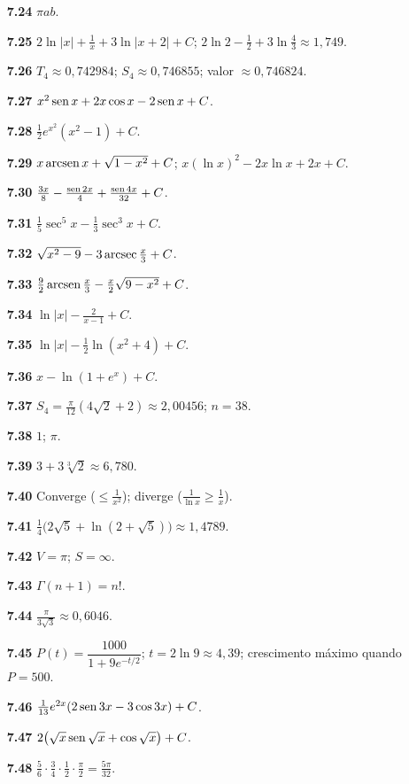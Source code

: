 {\begin{multicols}{2}
\begin{itemize}[leftmargin=2.7em,labelsep=0.5em,itemsep=1pt]
\item[\textbf{7.24}] $\pi ab$.
\item[\textbf{7.25}] $2\ln|x|+\frac1x+3\ln|x+2|+C$; $2\ln2-\tfrac12+3\ln\tfrac43\approx1{,}749$.
\item[\textbf{7.26}] $T_4\approx0{,}742984$; $S_4\approx0{,}746855$; valor $\approx0{,}746824$.
\item[\textbf{7.27}] $x^2\operatorname{sen} x+2x\cos x-2\operatorname{sen} x+C$.
\item[\textbf{7.28}] $\tfrac12e^{x^2}(x^2-1)+C$.
\item[\textbf{7.29}] $x\operatorname{arcsen} x+\sqrt{1-x^2}+C$; $x(\ln x)^2-2x\ln x+2x+C$.
\item[\textbf{7.30}] $\tfrac{3x}8-\tfrac{\operatorname{sen}2x}4+\tfrac{\operatorname{sen}4x}{32}+C$.
\item[\textbf{7.31}] $\tfrac15\sec^5x-\tfrac13\sec^3x+C$.
\item[\textbf{7.32}] $\sqrt{x^2-9}-3\operatorname{arcsec}\tfrac x3+C$.
\item[\textbf{7.33}] $\tfrac92\operatorname{arcsen}\tfrac x3-\tfrac x2\sqrt{9-x^2}+C$.
\item[\textbf{7.34}] $\ln|x|-\tfrac2{x-1}+C$.
\item[\textbf{7.35}] $\ln|x|-\tfrac12\ln(x^2+4)+C$.
\item[\textbf{7.36}] $x-\ln(1+e^x)+C$.
\item[\textbf{7.37}] $S_4=\tfrac\pi{12}(4\sqrt2+2)\approx2{,}00456$; $n=38$.
\item[\textbf{7.38}] $1$; $\pi$.
\item[\textbf{7.39}] $3+3\sqrt[3]2\approx6{,}780$.
\item[\textbf{7.40}] Converge ($\le\tfrac1{x^2}$); diverge ($\tfrac1{\ln x}\ge\tfrac1x$).
\item[\textbf{7.41}] $\tfrac14\big(2\sqrt5+\ln(2+\sqrt5)\big)\approx1{,}4789$.
\item[\textbf{7.42}] $V=\pi$; $S=\infty$.
\item[\textbf{7.43}] $\Gamma(n+1)=n!$.
\item[\textbf{7.44}] $\tfrac{\pi}{3\sqrt3}\approx0{,}6046$.
\item[\textbf{7.45}] $P(t)=\dfrac{1000}{1+9e^{-t/2}}$; $t=2\ln9\approx4{,}39$; crescimento máximo quando $P=500$.
\item[\textbf{7.46}] $\tfrac1{13}e^{2x}(2\operatorname{sen}3x-3\cos3x)+C$.
\item[\textbf{7.47}] $2\big(\sqrt x\operatorname{sen}\sqrt x+\cos\sqrt x\big)+C$.
\item[\textbf{7.48}] $\tfrac56\cdot\tfrac34\cdot\tfrac12\cdot\tfrac\pi2=\tfrac{5\pi}{32}$.

\end{itemize}
\end{multicols}}
